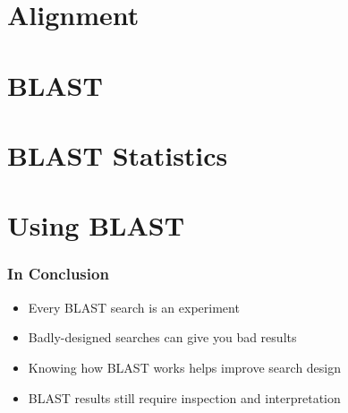   
\section{Alignment} 
  
  
  

\section{BLAST}
  
  
  
  

\section{BLAST Statistics}
   
  
  
\section{Using BLAST}
  
  
  
  

\begin{frame}
  \frametitle{In Conclusion}
  \begin{itemize}
    \item Every BLAST search is an experiment
    \item Badly-designed searches can give you bad results
    \item Knowing how BLAST works helps improve search design
    \item BLAST results still require inspection and interpretation
  \end{itemize}
\end{frame}     
    

